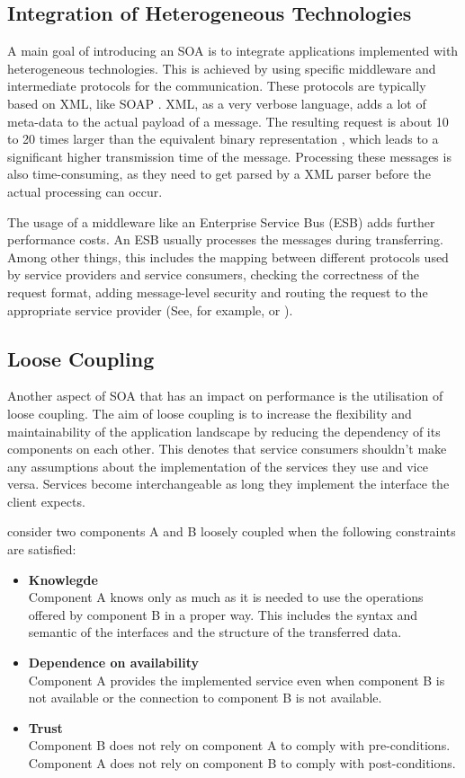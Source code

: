 \subsection{Integration of Heterogeneous Technologies}
A main goal of introducing an SOA is to integrate applications implemented with heterogeneous technologies. This is achieved by using specific middleware and intermediate protocols for the communication. These protocols are typically based on XML, like SOAP \citep{soap:2007}. XML, as a very verbose language, adds a lot of meta-data to the actual payload of a message. The resulting request is about 10 to 20 times larger than the equivalent binary representation \citep{OBrien:2007fk}, which leads to a significant higher transmission time of the message. Processing these messages is also time-consuming, as they need to get parsed by a XML parser before the actual processing can occur.

The usage of a middleware like an Enterprise Service Bus (ESB) adds further performance costs. An ESB usually processes the messages during transferring. Among other things, this includes the mapping between different protocols used by service providers and service consumers, checking the correctness of the request format, adding message-level security and routing the request to the appropriate service provider (See, for example, \citet{Josuttis:2007fk} or \citet{Krafzig:2005zc}).
\subsection{Loose Coupling}
Another aspect of SOA that has an impact on performance is the utilisation of loose coupling. The aim of loose coupling is to increase the flexibility and maintainability of the application landscape by reducing the dependency of its components on each other. This denotes that service consumers shouldn't make any assumptions about the implementation of the services they use and vice versa. Services become interchangeable as long they implement the interface the client expects.

\citet{Engels:2008nr} consider two components A and B loosely coupled when the following constraints are satisfied:
\begin{itemize}
	\item \textbf{Knowlegde}\\
	Component A knows only as much as it is needed to use the operations offered by component B in a proper way. This includes the syntax and semantic of the interfaces and the structure of the transferred data.
	\item \textbf{Dependence on availability}\\
	Component A provides the implemented service even when component B is not available or the connection to component B is not available.
	\item \textbf{Trust}\\
	Component B does not rely on component A to comply with pre-conditions. Component A does not rely on component B to comply with post-conditions.
\end{itemize}


